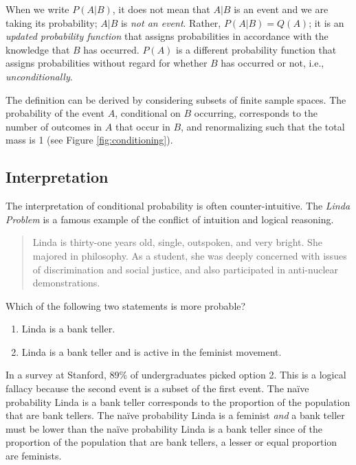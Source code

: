 \documentclass[11pt,a4paper]{article}
\begin{document}
When we write \(P(A|B)\), 
it does not mean that \(A|B\) is an event and we are taking its probability; 
\(A|B\) is \emph{not an event}. 
Rather,
\(P\left( A | B \right) = Q(A)\);
it is an \emph{updated probability function} 
that assigns probabilities in accordance with the knowledge that \(B\) has occurred.
\(P(A)\) is a different probability function that assigns probabilities 
without regard for whether \(B\) has occurred or not, 
i.e., \emph{unconditionally}.

The definition can be derived by considering subsets 
of finite sample spaces. 
The probability of the event \(A\), 
conditional on \(B\) occurring, 
corresponds to the number of outcomes in \(A\) that occur in \(B\), 
and renormalizing such that the total mass is 1 (see Figure \ref{fig:conditioning}).

\subsection{Interpretation}

The interpretation of conditional probability is often counter-intuitive. 
The \emph{Linda Problem} is a famous example of 
the conflict of intuition and logical reasoning.

\begin{quote}
Linda is thirty-one years old, single, outspoken, and very bright. 
She majored in philosophy. 
As a student, 
she was deeply
concerned with issues of discrimination and social justice, 
and also participated in anti-nuclear demonstrations.
\end{quote}

Which of the following two statements is more probable?
\begin{enumerate}
\item Linda is a bank teller.
\item Linda is a bank teller and is active in the feminist movement.
\end{enumerate}

In a survey at Stanford, 
89\% of undergraduates picked option 2. 
This is a logical fallacy because the second event is 
a subset of the first event. 
The naïve probability Linda is a bank teller corresponds to the proportion of the population that are bank tellers. 
The naïve probability Linda is a feminist \emph{and} a bank teller must be lower than
the naïve probability Linda is a bank teller since of the proportion of the population that are bank tellers, 
a lesser or equal proportion are feminists.
\end{document}
